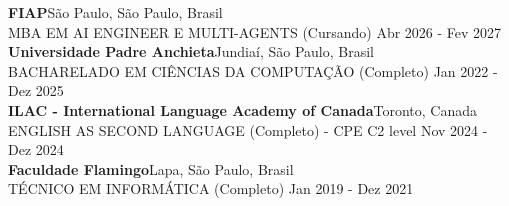     \vspace{2mm}
    \textbf{FIAP}\hfill São Paulo, São Paulo, Brasil\\
    MBA EM AI ENGINEER E MULTI-AGENTS (Cursando) \hfill Abr 2026 - Fev 2027\\
    \vspace{2mm}
    \textbf{Universidade Padre Anchieta}\hfill Jundiaí, São Paulo, Brasil\\
    BACHARELADO EM CIÊNCIAS DA COMPUTAÇÃO (Completo) \hfill Jan 2022 - Dez 2025\\
    \vspace{2mm}
    \textbf{ILAC - International Language Academy of Canada}\hfill Toronto, Canada\\
    ENGLISH AS SECOND LANGUAGE (Completo) - CPE C2 level \hfill Nov 2024 - Dez 2024\\
    \vspace{2mm}
    \textbf{Faculdade Flamingo}\hfill Lapa, São Paulo, Brasil\\
    TÉCNICO EM INFORMÁTICA (Completo) \hfill Jan 2019 - Dez 2021\\


